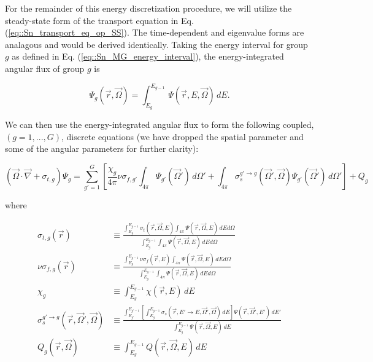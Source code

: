 For the remainder of this energy discretization procedure, we will utilize the steady-state form of the transport equation in Eq. (\ref{eq::Sn_transport_eq_op_SS}). The time-dependent and eigenvalue forms are analagous and would be derived identically. Taking the energy interval for group $g$ as defined in Eq. (\ref{eq::Sn_MG_energy_interval}), the energy-integrated angular flux of group $g$ is

\begin{equation}
\label{eq::Sn_MG_ang_flux_g}
\Psi_g (\vec{r}, \vec{\Omega}) = \int_{E_g}^{E_{g-1}} \, \Psi (\vec{r}, E, \vec{\Omega}) \, dE .
\end{equation}

\noindent We can then use the energy-integrated angular flux to form the following coupled, $(g=1,...,G)$, discrete equations (we have dropped the spatial parameter and some of the angular parameters for further clarity):

\begin{equation}
\label{eq::Sn_MG_trans_eq}
\left(  \vec{\Omega} \cdot \vec{\nabla} + \sigma_{t,g}  \right) \Psi_g =  \sum_{g'=1}^{G} \left[ \frac{\chi_g}{4 \pi} \nu \sigma_{f,g'} \int_{4 \pi} \Psi_{g'} (\vec{\Omega}') \, d\Omega' + \int_{4 \pi} \sigma_{s}^{g' \rightarrow g} (\vec{\Omega}' , \vec{\Omega} ) \Psi_{g'} (\vec{\Omega}')  \, d\Omega'  \right] + Q_g
\end{equation}

\noindent where

\begin{equation}
\label{eq::Sn_MG_exact_condensed_terms}
\begin{aligned}
\sigma_{t,g} (\vec{r}) & \equiv \frac{\int_{E_{g}}^{E_{g-1}} \sigma_{t} (\vec{r},\vec{\Omega},E) \int_{4 \pi} \Psi (\vec{r},\vec{\Omega}, E) \, dE d\Omega}{\int_{E_{g}}^{E_{g-1}} \int_{4 \pi} \Psi (\vec{r},\vec{\Omega}, E) \, dE d\Omega}\\
\nu\sigma_{f,g} (\vec{r}) & \equiv \frac{\int_{E_{g}}^{E_{g-1}} \nu\sigma_{f} (\vec{r},E)  \int_{4 \pi} \Psi (\vec{r},\vec{\Omega}, E) \, dE d\Omega}{\int_{E_{g}}^{E_{g-1}} \int_{4 \pi} \Psi (\vec{r},\vec{\Omega}, E) \, dE d\Omega} \\
\chi_g & \equiv \int_{E_{g}}^{E_{g-1}} \chi  (\vec{r},E) \, dE \\
\sigma_{s}^{g' \rightarrow g} (\vec{r},\vec{\Omega}' , \vec{\Omega} ) & \equiv \frac{\int_{E_{g'}}^{E_{g'-1}} \left[ \int_{E_{g}}^{E_{g-1}} \sigma_s (\vec{r},E' \rightarrow E,\vec{\Omega}' , \vec{\Omega} ) \, dE \right] \Psi (\vec{r},\vec{\Omega}', E') \, dE' }{\int_{E_{g}}^{E_{g-1}}  \Psi (\vec{r},\vec{\Omega}, E) \, dE} \\
Q_g (\vec{r}, \vec{\Omega}) & \equiv \int_{E_{g}}^{E_{g-1}} Q (\vec{r}, \vec{\Omega}, E) \, dE
\end{aligned}
\end{equation}

